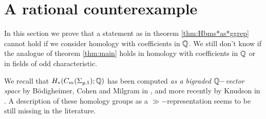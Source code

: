 \section{A rational counterexample}
In this section we prove that a statement as in theorem \ref{thm:Hbms*as*ggrep}
cannot hold if we consider homology with coefficients in $\mathbb{Q}$. We still don't know
if the analogue of theorem \ref{thm:main} holds in homology with coefficients in $\mathbb{Q}$
or in fields of odd characteristic.

We recall that $H_*(C_m(\Sigma_{g,1});\mathbb{Q})$ has been computed \emph{as a bigraded $\mathbb{Q}-$vector space}
by B\"odigheimer, Cohen and Milgram in \cite{BCM}, and more recently by Knudson in \cite{Knudson}. A description of
these homology groups as a
$\gg-$representation seems to be still missing in the literature.

